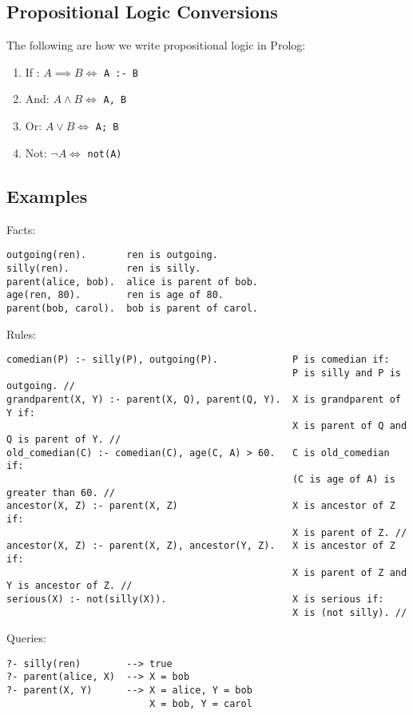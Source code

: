 \documentclass{article}
\begin{document}
\subsection{Propositional Logic Conversions}
The following are how we write propositional logic in Prolog:
\begin{enumerate}[label=(\roman*)]
\item If : $A \implies B \iff$ \texttt{A :- B}
\item And: $A \land B \iff$ \texttt{A, B}
\item Or: $A \lor B \iff$ \texttt{A; B}
\item Not: $\lnot A \iff$ \texttt{not(A)}
\end{enumerate}

\subsection*{Examples}
Facts:
\begin{verbatim}
outgoing(ren).       ren is outgoing.
silly(ren).          ren is silly.
parent(alice, bob).  alice is parent of bob.
age(ren, 80).        ren is age of 80.
parent(bob, carol).  bob is parent of carol.
\end{verbatim}
Rules:
\begin{verbatim}
comedian(P) :- silly(P), outgoing(P).             P is comedian if:
                                                  P is silly and P is outgoing. //
grandparent(X, Y) :- parent(X, Q), parent(Q, Y).  X is grandparent of Y if:
                                                  X is parent of Q and Q is parent of Y. //
old_comedian(C) :- comedian(C), age(C, A) > 60.   C is old_comedian if:
                                                  (C is age of A) is greater than 60. //
ancestor(X, Z) :- parent(X, Z)                    X is ancestor of Z if:
                                                  X is parent of Z. //
ancestor(X, Z) :- parent(X, Z), ancestor(Y, Z).   X is ancestor of Z if:
                                                  X is parent of Z and Y is ancestor of Z. //
serious(X) :- not(silly(X)).                      X is serious if:
                                                  X is (not silly). //
\end{verbatim}
Queries:
\begin{verbatim}
?- silly(ren)        --> true
?- parent(alice, X)  --> X = bob
?- parent(X, Y)      --> X = alice, Y = bob
                         X = bob, Y = carol
\end{verbatim}
\end{document}
